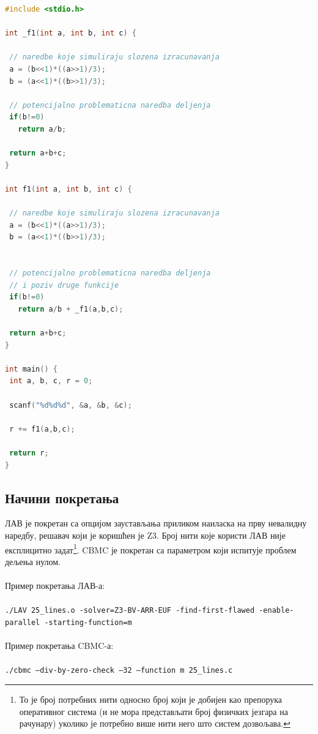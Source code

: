 \documentclass[12pt,oneside]{memoir}
\begin{document}
\begin{lstlisting}[language=C,frame=single,caption=Пример програма друге категорије (друга верзија),label=primer_nivo_2t]
#include <stdio.h>

int _f1(int a, int b, int c) {

 // naredbe koje simuliraju slozena izracunavanja 
 a = (b<<1)*((a>>1)/3);
 b = (a<<1)*((b>>1)/3);
 
 // potencijalno problematicna naredba deljenja
 if(b!=0)
   return a/b;
   
 return a+b+c;
}

int f1(int a, int b, int c) {

 // naredbe koje simuliraju slozena izracunavanja 
 a = (b<<1)*((a>>1)/3);
 b = (a<<1)*((b>>1)/3);
 
 
 // potencijalno problematicna naredba deljenja
 // i poziv druge funkcije
 if(b!=0)
   return a/b + _f1(a,b,c);
   
 return a+b+c;
}

int main() {
 int a, b, c, r = 0;
 
 scanf("%d%d%d", &a, &b, &c);
 
 r += f1(a,b,c);
 
 return r;
}


\end{lstlisting}



\subsection{Начини покретања}

ЛАВ је покретан са опцијом заустављања приликом наиласка на прву невалидну наредбу, решавач који је коришћен је Z3. Број нити које користи ЛАВ није експлицитно задат\footnote{То је број потребних нити односно број који је добијен као препорука оперативног система (и не мора представљати број физичких језгара на рачунару) уколико је потребно више нити него што систем дозвољава.}. CBMC је покретан са параметром који испитује проблем дељења нулом.
\\
\\
Пример покретања ЛАВ-а:
\\ \\
\texttt{./LAV 25\_lines.o -solver=Z3-BV-ARR-EUF -find-first-flawed -enable-parallel -starting-function=m}
\\ \\
Пример покретања CBMC-а:
\\ \\
\texttt{./cbmc --div-by-zero-check --32 --function m 25\_lines.c}
\end{document}
